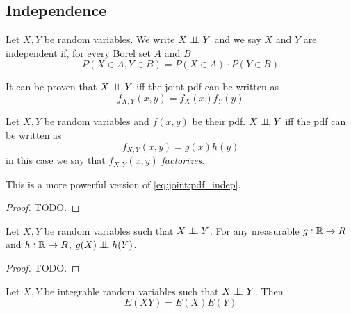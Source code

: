 \documentclass[14pt]{extarticle}
\begin{document}
\subsection{Independence}

\begin{definition}
    Let $X, Y$ be random variables.
    We write $X \perp \!\!\! \perp Y$ and we say $X$ and $Y$ are independent if, for every Borel set $A$ and $B$
    \begin{equation}
        P(X \in A, Y \in B) = P(X\in A) \cdot P(Y \in B)
    \end{equation}
\end{definition}

It can be proven that $X \perp \!\!\! \perp Y$ iff the joint pdf can be written as
\begin{equation}
    f_{X, Y} (x, y) = f_X(x)f_Y(y) \label{eq:joint:pdf_indep}
\end{equation}

\begin{theorem}
    Let $X, Y$ be random variables and $f(x,y)$ be their pdf.
    $X \perp \!\!\! \perp Y$ iff the pdf can be written as
    \begin{equation}
        f_{X, Y}(x, y) = g(x)h(y)
    \end{equation}
    in this case we say that $f_{X, Y} (x, y)$ \emph{factorizes}.

    This is a more powerful version of \autoref{eq:joint:pdf_indep}.
\end{theorem}

\begin{proof}
    TODO.
\end{proof}

\begin{theorem}
    \label{thm:joint:transformation_independent}

    Let $X, Y$ be random variables such that $X \perp \!\!\! \perp Y$.
    For any measurable $g: \mathbb{R} \to R$ and $h: \mathbb{R} \to R$, $g(X) \perp \!\!\! \perp h(Y)$.
\end{theorem}

\begin{proof}
    TODO.
\end{proof}

\begin{theorem}
    Let $X, Y$ be integrable random variables such that $X \perp \!\!\! \perp Y$. Then
    \begin{equation}
        E(XY) = E(X)E(Y)
    \end{equation}
\end{theorem}
\end{document}
